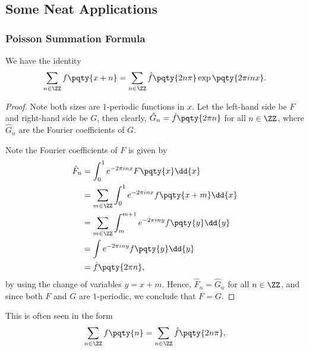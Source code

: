 \subsection{Some Neat Applications}

\subsubsection{Poisson Summation Formula}

\begin{proposition}
    We have the identity
    \begin{equation}
        \sum_{n \in \ZZ} f\pqty{x + n} = \sum_{n \in \ZZ} \hat{f}\pqty{2 n \pi} \exp\pqty{2 \pi i n x}.
    \end{equation}
\end{proposition}

\begin{proof}
    Note both sizes are \(1\)-periodic functions in \(x\). Let the left-hand side be \(F\) and right-hand side be \(G\), then clearly, \(\hat{G}_n = \hat{f} \pqty{2 \pi n}\) for all \(n \in \ZZ\), where \(\hat{G}_n\) are the Fourier coefficients of \(G\).
    
    Note the Fourier coefficients of \(F\) is given by
    \begin{subequations}
        \begin{align}
            \hat{F}_n &= \int_{0}^{1} e^{- 2\pi i n x} F \pqty{x} \dd{x} \\
            &= \sum_{m \in \ZZ} \int_{0}^{1} e^{- 2\pi i n x} f\pqty{x + m} \dd{x} \\
            &= \sum_{m \in \ZZ} \int_{m}^{m + 1} e^{- 2\pi i n y} f\pqty{y} \dd{y} \\
            &= \int e^{- 2\pi i n y} f\pqty{y} \dd{y} \\
            &= \hat{f} \pqty{2 \pi n},
        \end{align}
    \end{subequations}
    by using the change of variables \(y = x + m\). Hence, \(\hat{F}_n = \hat{G}_n\) for all \(n \in \ZZ\), and since both \(F\) and \(G\) are \(1\)-periodic, we conclude that \(F = G\).
\end{proof}

This is often seen in the form
\begin{equation}
    \sum_{n \in \ZZ} f\pqty{n} = \sum_{n \in \ZZ} \hat{f}\pqty{2 n \pi},
\end{equation}

